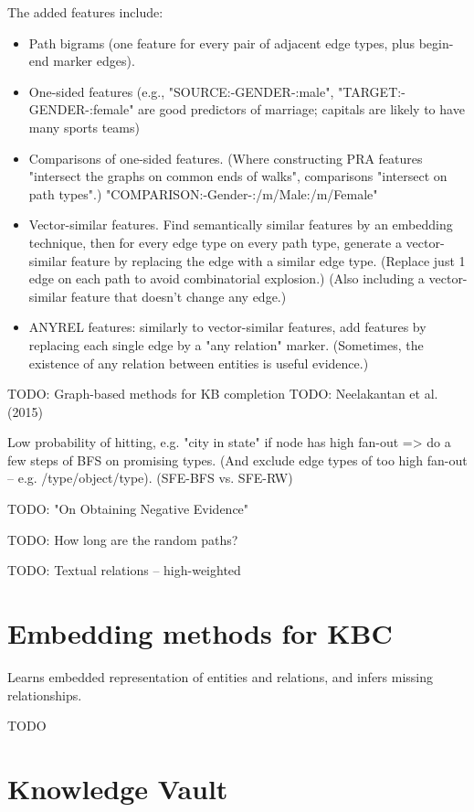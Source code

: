 The added features include:
\begin{itemize}
\item Path bigrams (one feature for every pair of adjacent
edge types, plus begin-end marker edges).
\item One-sided features (e.g., "SOURCE:-GENDER-:male", "TARGET:-GENDER-:female"
are good predictors of marriage; capitals are likely to have many sports teams)
\item Comparisons of one-sided features. (Where constructing PRA features
"intersect the graphs on common ends of walks", comparisons "intersect on
path types".) "COMPARISON:-Gender-:/m/Male:/m/Female"
\item Vector-similar features. Find semantically similar features by an
embedding technique, then for every edge type on every path type, generate
a vector-similar feature by replacing the edge with a similar edge type.
(Replace just 1 edge on each path to avoid combinatorial explosion.)
(Also including a vector-similar feature that doesn't change any edge.)
\item ANYREL features: similarly to vector-similar features, add features
by replacing each single edge by a "any relation" marker. (Sometimes, the
existence of any relation between entities is useful evidence.)
\end{itemize}

TODO: Graph-based methods for KB completion
TODO: Neelakantan et al. (2015)

Low probability of hitting, e.g. "city in state" if node has high fan-out =>
do a few steps of BFS on promising types. (And exclude edge types of too high
fan-out -- e.g. /type/object/type). (SFE-BFS vs. SFE-RW)

TODO: "On Obtaining Negative Evidence"

TODO: How long are the random paths?

TODO: Textual relations -- high-weighted

\section{Embedding methods for KBC}

Learns embedded representation of entities and relations, and infers missing
relationships.

TODO

\section{Knowledge Vault}


